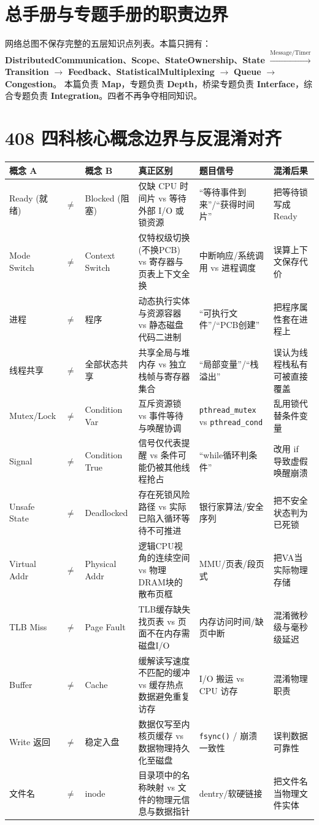 \documentclass[11pt,a4paper,openany]{ctexbook}
\newcommand{\key}[1]{\textbf{\color{deep}#1}}
\begin{document}
\section{总手册与专题手册的职责边界}
网络总图不保存完整的五层知识点列表。本篇只拥有：\key{DistributedCommunication}、\key{Scope}、\key{StateOwnership}、\key{State} $\xrightarrow{\text{Message/Timer}}$ \key{Transition} $\rightarrow$ \key{Feedback}、\key{StatisticalMultiplexing} $\rightarrow$ \key{Queue} $\rightarrow$ \key{Congestion}。
本篇负责 \textbf{Map}，专题负责 \textbf{Depth}，桥梁专题负责 \textbf{Interface}，综合专题负责 \textbf{Integration}。四者不再争夺相同知识。

\section{408 四科核心概念边界与反混淆对齐}
\begin{longtable}{L{2.2cm}@{}>{\centering\arraybackslash}p{0.5cm}@{}L{2.2cm}L{4.2cm}L{4.2cm}L{\dimexpr\linewidth-13.9cm\relax}}
\toprule
\textbf{概念 A} & & \textbf{概念 B} & \textbf{真正区别} & \textbf{题目信号} & \textbf{混淆后果}\\
\midrule
Ready (就绪) & $\neq$ & Blocked (阻塞) & 仅缺 CPU 时间片 vs 等待外部 I/O 或锁资源 & “等待事件到来”/“获得时间片” & 把等待锁写成 Ready\\
Mode Switch & $\neq$ & Context Switch & 仅特权级切换(不换PCB) vs 寄存器与页表上下文全换 & 中断响应/系统调用 vs 进程调度 & 误算上下文保存代价\\
进程 & $\neq$ & 程序 & 动态执行实体与资源容器 vs 静态磁盘代码二进制 & “可执行文件”/“PCB创建” & 把程序属性套在进程上\\
线程共享 & $\neq$ & 全部状态共享 & 共享全局与堆内存 vs 独立栈帧与寄存器集合 & “局部变量”/“栈溢出” & 误认为线程栈私有可被直接覆盖\\
Mutex/Lock & $\neq$ & Condition Var & 互斥资源锁 vs 事件等待与唤醒协调 & \texttt{pthread\_mutex} vs \texttt{pthread\_cond} & 乱用锁代替条件变量\\
Signal & $\neq$ & Condition True & 信号仅代表提醒 vs 条件可能仍被其他线程抢占 & “while循环判条件” & 改用 if 导致虚假唤醒崩溃\\
Unsafe State & $\neq$ & Deadlocked & 存在死锁风险路径 vs 实际已陷入循环等待不可推进 & 银行家算法/安全序列 & 把不安全状态判为已死锁\\
Virtual Addr & $\neq$ & Physical Addr & 逻辑CPU视角的连续空间 vs 物理DRAM块的散布页框 & MMU/页表/段页式 & 把VA当实际物理存储\\
TLB Miss & $\neq$ & Page Fault & TLB缓存缺失找页表 vs 页面不在内存需磁盘I/O & 内存访问时间/缺页中断 & 混淆微秒级与毫秒级延迟\\
Buffer & $\neq$ & Cache & 缓解读写速度不匹配的缓冲 vs 缓存热点数据避免重复访存 & I/O 搬运 vs CPU 访存 & 混淆物理职责\\
Write 返回 & $\neq$ & 稳定入盘 & 数据仅写至内核页缓存 vs 数据物理持久化至磁盘 & \texttt{fsync()} / 崩溃一致性 & 误判数据可靠性\\
文件名 & $\neq$ & inode & 目录项中的名称映射 vs 文件的物理元信息与数据指针 & dentry/软硬链接 & 把文件名当物理文件实体\\
\bottomrule
\end{longtable}
\end{document}

